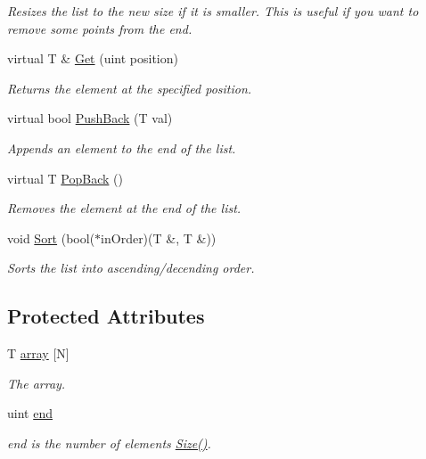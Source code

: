 \begin{DoxyCompactItemize}
\begin{DoxyCompactList}\small\item\em Resizes the list to the new size if it is smaller. This is useful if you want to remove some points from the end. \end{DoxyCompactList}\item 
virtual T \& \hyperlink{classutil_1_1ArrayList_ac5a4259af59f7bac9df06851c29d9e37}{Get} (uint position)
\begin{DoxyCompactList}\small\item\em Returns the element at the specified position. \end{DoxyCompactList}\item 
virtual bool \hyperlink{classutil_1_1ArrayList_a75e2f1682ebe7a982b6fd301d416d536}{Push\+Back} (T val)
\begin{DoxyCompactList}\small\item\em Appends an element to the end of the list. \end{DoxyCompactList}\item 
virtual T \hyperlink{classutil_1_1ArrayList_ac03915c0d58b62bf78148737be86fafc}{Pop\+Back} ()
\begin{DoxyCompactList}\small\item\em Removes the element at the end of the list. \end{DoxyCompactList}\item 
void \hyperlink{classutil_1_1ArrayList_a6f42b37e970d8416b7036e05185ca1d2}{Sort} (bool($\ast$in\+Order)(T \&, T \&))
\begin{DoxyCompactList}\small\item\em Sorts the list into ascending/decending order. \end{DoxyCompactList}\end{DoxyCompactItemize}
\subsection*{Protected Attributes}
\begin{DoxyCompactItemize}
\item 
\mbox{\label{classutil_1_1ArrayList_ad7dccc1496cfdb432d6e8f290af66c7b}} 
T \hyperlink{classutil_1_1ArrayList_ad7dccc1496cfdb432d6e8f290af66c7b}{array} \mbox{[}N\mbox{]}
\begin{DoxyCompactList}\small\item\em The array. \end{DoxyCompactList}\item 
\mbox{\label{classutil_1_1ArrayList_ad904fc999f0560f504e65be642ad9e86}} 
uint \hyperlink{classutil_1_1ArrayList_ad904fc999f0560f504e65be642ad9e86}{end}
\begin{DoxyCompactList}\small\item\em end is the number of elements \hyperlink{classutil_1_1ArrayList_ae098e879892c23b682edc4b023a770de}{Size()}. \end{DoxyCompactList}\end{DoxyCompactItemize}


